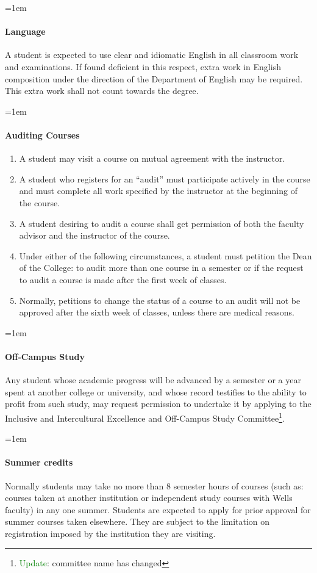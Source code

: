 \documentclass{manual}
\newcommand{\modified}[1]{}
\let\oldparagraph\paragraph
\renewcommand\paragraph{\leftskip=1em\oldparagraph}
\newcommand{\editRemark}[3]{\textcolor{green}{#2}\footnote{\textcolor{green}{#1}: #3}}
\newcommand{\editRemove}[1]{}
\newcommand{\they}{(pronoun)~ }
\newcommand{\them}{(pronoun)~ }
\newcommand{\itemLevelA}{\alph*.}
\newcommand{\itemRefA}{\alph*}
\begin{document}
\paragraph{Language}
 A student is expected to use clear and idiomatic English in all classroom work and examinations. If found deficient in this respect, \editRemove{\they may be required to take} extra work in English composition under the direction of the Department of English may be required. This extra work shall not count towards the degree.

\paragraph{Auditing Courses}
\begin{enumerate}[label=\itemLevelA,ref=\itemRefA]
\item A student may visit a course on mutual agreement with the instructor. 
\item A student who registers for an ``audit''\editRemove{, \they} must participate actively in the course and must complete all work specified \editRemove{for \them} by the instructor at the beginning of the course.
\item  A student desiring to audit a course shall get permission of both the faculty advisor and the instructor of the course.
\item Under either of the following circumstances, a student must petition the Dean of the College: \editRemove{if \they wishes} to audit more than one course in a semester or if the request to audit a course is made after the first week of classes. 
\item Normally, petitions to change the status of a course to an audit will not be approved after the sixth week of classes, unless there are medical reasons.
\end{enumerate}

\paragraph{Off-Campus Study}
 Any student whose academic progress will be advanced by a semester or a year spent at another college or university, and whose record testifies to the ability to profit from such study, may request permission to undertake it by applying to the Inclusive and Intercultural Excellence and Off-Campus Study Committee\editRemark{Update}{}{committee name has changed}.

\paragraph{Summer credits}
Normally students may take no more than 8 semester hours of courses (such as: courses taken at another institution or independent study courses with Wells faculty) in any one summer. Students are expected to apply for prior approval for summer courses taken elsewhere. They are subject to the limitation on registration imposed by the institution they are visiting.\modified{5/13/93}
\end{document}
